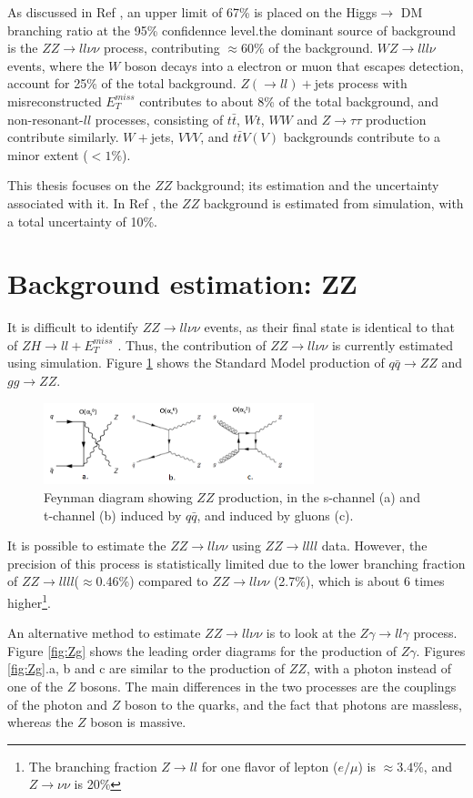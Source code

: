 \documentclass[11pt,a4paper,openright,twoside]{report}
\newcommand{\ZZ}{$ZZ\to ll\nu\nu$ }
\newcommand{\Zg}{$Z\gamma\to ll\gamma$ }
\newcommand{\met}{$E_T^{miss}$ }
\begin{document}
As discussed in Ref \cite{ZH_ATLAS}, an upper limit of 67\% is placed on the Higgs$\to$ DM branching ratio at the 95\% confidennce level.the dominant source of background is the \ZZ process, contributing $\approx 60\%$ of the background. $WZ\to lll\nu$ events, where the $W$ boson decays into a electron or muon that escapes detection, account for 25\% of the total background. $Z(\to ll)+$jets process with misreconstructed \met contributes to about 8\% of the total background, and non-resonant-$ll$ processes, consisting of $t\bar{t}$, $Wt$, $WW$ and $Z\to\tau\tau$ production contribute similarly. $W+$jets, $VVV$, and $t\bar{t}V(V)$ backgrounds contribute to a minor extent ($<1\%$).

This thesis focuses on the $ZZ$ background; its estimation and the uncertainty associated with it. In Ref \cite{ZH_ATLAS}, the $ZZ$ background is estimated from simulation, with a total uncertainty of 10\%.

\section{Background estimation: ZZ}
It is difficult to identify \ZZ events, as their final state is identical to that of $ZH\to ll+$\met. Thus, the contribution of \ZZ is currently estimated using simulation. Figure \ref{fig:ZZ} shows the Standard Model production of $q\bar{q}\to ZZ$ and $gg\to ZZ$.

\begin{figure}[H]
\centering
		\includegraphics[width=0.7\textwidth]{ZZ.png}
		\caption{Feynman diagram showing $ZZ$ production, in the s-channel (a) and t-channel (b) induced by $q\bar{q}$, and induced by gluons (c).}
		\label{fig:ZZ}
\end{figure}

It is possible to estimate the \ZZ using $ZZ\to llll$ data. However, the precision of this process is statistically limited due to the lower branching fraction of $ZZ\to llll$($\approx$0.46\%) compared to \ZZ (2.7\%), which is about 6 times higher\footnote{The branching fraction $Z\to ll$ for one flavor of lepton ($e/\mu$) is $\approx 3.4\%$, and $Z\to\nu\nu$ is 20\% }.

An alternative method to estimate \ZZ is to look at the \Zg process. Figure \ref{fig:Zg} shows the leading order diagrams for the production of $Z\gamma$. Figures \ref{fig:Zg}.a, b and c are similar to the production of $ZZ$, with a photon instead of one of the $Z$ bosons. The main differences in the two processes are the couplings of the photon and $Z$ boson to the quarks, and the fact that photons are massless, whereas the $Z$ boson is massive. 
\end{document}
